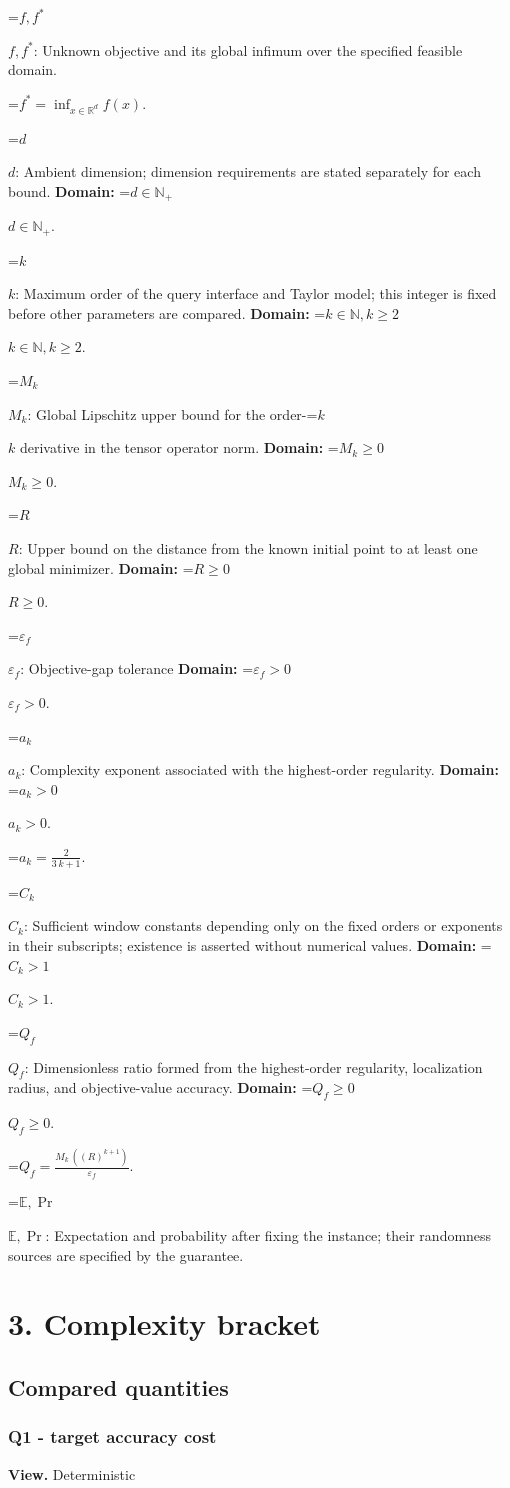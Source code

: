 \documentclass[10pt,a4paper]{article}
\newcommand{\AtlasMath}[1]{\par\begingroup\centering\setbox0=\hbox{$\displaystyle #1$}\ifdim\wd0>1.4\linewidth\typeout{ATLAS WIDE FORMULA: \the\wd0}\fi\ifdim\wd0>\linewidth\resizebox{\linewidth}{!}{\box0}\else\box0\fi\par\endgroup}
\newcommand{\AtlasInlineMath}[1]{\begingroup\setbox0=\hbox{$#1$}\ifdim\wd0>.4\linewidth\endgroup\AtlasMath{#1}\else\endgroup$#1$\fi}
\begin{document}
\AtlasInlineMath{f,f^*}: Unknown objective and its global infimum over the specified feasible domain.




\AtlasMath{f^*=\inf_{x\in \mathbb{R}^d}f(x).}




\AtlasInlineMath{d}: Ambient dimension; dimension requirements are stated separately for each bound. \textbf{Domain:} \AtlasInlineMath{d\in\mathbb{N}_{+}}.

\AtlasInlineMath{k}: Maximum order of the query interface and Taylor model; this integer is fixed before other parameters are compared. \textbf{Domain:} \AtlasInlineMath{k\in\mathbb{N}, k\ge2}.

\AtlasInlineMath{M_k}: Global Lipschitz upper bound for the order-\AtlasInlineMath{k} derivative in the tensor operator norm. \textbf{Domain:} \AtlasInlineMath{M_k\ge0}.

\AtlasInlineMath{R}: Upper bound on the distance from the known initial point to at least one global minimizer. \textbf{Domain:} \AtlasInlineMath{R\ge0}.

\AtlasInlineMath{\varepsilon_f}: Objective-gap tolerance \textbf{Domain:} \AtlasInlineMath{\varepsilon_f>0}.

\AtlasInlineMath{a_k}: Complexity exponent associated with the highest-order regularity. \textbf{Domain:} \AtlasInlineMath{a_k>0}.




\AtlasMath{a_k=\frac{2}{3\,k+1}.}




\AtlasInlineMath{C_{k}}: Sufficient window constants depending only on the fixed orders or exponents in their subscripts; existence is asserted without numerical values. \textbf{Domain:} \AtlasInlineMath{C_{k}>1}.

\AtlasInlineMath{Q_f}: Dimensionless ratio formed from the highest-order regularity, localization radius, and objective-value accuracy. \textbf{Domain:} \AtlasInlineMath{Q_f\ge0}.




\AtlasMath{Q_f=\frac{M_k\,((R)^{k+1})}{\varepsilon_f}.}




\AtlasInlineMath{\mathbb{E},\Pr}: Expectation and probability after fixing the instance; their randomness sources are specified by the guarantee.

\section{3. Complexity bracket}
\subsection{Compared quantities}
\subsubsection{Q1 - target accuracy cost}
\textbf{View.} Deterministic
\end{document}
